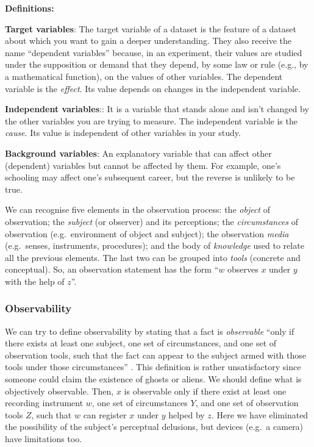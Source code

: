 \documentclass[
]{book}
\begin{document}
\begin{tipbox}

\textbf{Definitions:}

\textbf{Target variables}: The target variable of a dataset is the feature of a dataset about which you want to gain a deeper understanding. They also receive the name ``dependent variables'' because, in an experiment, their values are studied under the supposition or demand that they depend, by some law or rule (e.g., by a mathematical function), on the values of other variables. The dependent variable is the \emph{effect}. Its value depends on changes in the independent variable.

\textbf{Independent variables}:: It is a variable that stands alone and isn't changed by the other variables you are trying to measure. The independent variable is the \emph{cause}. Its value is independent of other variables in your study.

\textbf{Background variables}: An explanatory variable that can affect other (dependent) variables but cannot be affected by them. For example, one's schooling may affect one's subsequent career, but the reverse is unlikely to be true.

\end{tipbox}

We can recognise five elements in the observation process: the \emph{object} of observation; the \emph{subject} (or observer) and its perceptions; the \emph{circumstances} of observation (e.g.~environment of object and subject); the observation \emph{media} (e.g.~senses, instruments, procedures); and the body of \emph{knowledge} used to relate all the previous elements. The last two can be grouped into \emph{tools} (concrete and conceptual). So, an observation statement has the form ``\(w\) observes \(x\) under \(y\) with the help of \(z\)''. \citep{bunge2017philosophy}

\hypertarget{observability}{%
\subsubsection{Observability}\label{observability}}

We can try to define observability by stating that a fact is \emph{observable} ``only if there exists at least one subject, one set of circumstances, and one set of observation tools, such that the fact can appear to the subject armed with those tools under those circumstances'' \citep{bunge2017philosophy}. This definition is rather unsatisfactory since someone could claim the existence of ghosts or aliens. We should define what is objectively observable. Then, \(x\) is observable only if there exist at least one recording instrument \(w\), one set of circumstances \(Y\), and one set of observation tools \(Z\), such that \(w\) can register \(x\) under \(y\) helped by \(z\). Here we have eliminated the possibility of the subject's perceptual delusions, but devices (e.g.~a camera) have limitations too.
\end{document}
